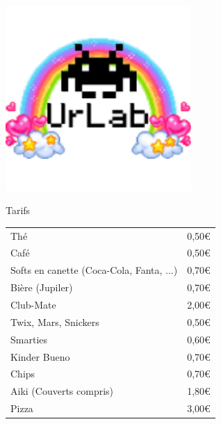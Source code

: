 \documentclass[a4paper,12pt]{article}
\begin{document}
\parindent0pt
\begin{center}
\includegraphics[width=200pt]{urlab.png}

 \Huge Tarifs
\end{center}

\LARGE
\begin{tabular}{ | l | l |}
  \hline
  Thé & 0,50\euro \\
  Café & 0,50\euro \\
  Softs en canette (Coca-Cola, Fanta, ...) & 0,70\euro \\
  Bière (Jupiler) & 0,70\euro \\
  Club-Mate & 2,00\euro \\
  \hline
  Twix, Mars, Snickers & 0,50\euro \\
  Smarties & 0,60\euro \\
  Kinder Bueno & 0,70\euro \\
  Chips & 0,70\euro \\
  \hline
  Aiki (Couverts compris) & 1,80\euro \\
  Pizza & 3,00\euro \\
  \hline

  \hline
\end{tabular}
\end{document}
